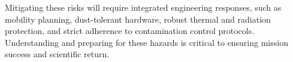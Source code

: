 \documentclass[12pt]{article}
\begin{document}
Mitigating these risks will require integrated engineering responses, such as mobility planning, dust-tolerant hardware, robust thermal and radiation protection, and strict adherence to contamination control protocols. Understanding and preparing for these hazards is critical to ensuring mission success and scientific return.
\end{document}
